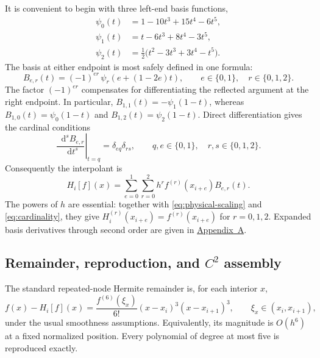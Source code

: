 \documentclass[11pt]{article}
\newcommand{\dd}{\mathop{}\!\mathrm{d}}
\begin{document}
It is convenient to begin with three left-end basis functions,
\begin{align}
  \psi_0(t)&=1-10t^3+15t^4-6t^5,\nonumber\\
  \psi_1(t)&=t-6t^3+8t^4-3t^5,\label{eq:psi-basis}\\
  \psi_2(t)&=\tfrac12\bigl(t^2-3t^3+3t^4-t^5\bigr).\nonumber
\end{align}
The basis at either endpoint is most safely defined in one formula:
\begin{equation}
  B_{e,r}(t)=(-1)^{er}\,
  \psi_r\!\left(e+(1-2e)t\right),
  \qquad e\in\{0,1\},\quad r\in\{0,1,2\}.
  \label{eq:oriented-basis}
\end{equation}
The factor $(-1)^{er}$ compensates for differentiating the reflected
argument at the right endpoint.  In particular,
\(B_{1,1}(t)=-\psi_1(1-t)\), whereas
\(B_{1,0}(t)=\psi_0(1-t)\) and
\(B_{1,2}(t)=\psi_2(1-t)\).  Direct differentiation gives the cardinal
conditions
\begin{equation}
  \left.\frac{\dd^s B_{e,r}}{\dd t^s}\right|_{t=q}
  =\delta_{eq}\delta_{rs},
  \qquad q,e\in\{0,1\},\quad r,s\in\{0,1,2\}.
  \label{eq:cardinality}
\end{equation}
Consequently the interpolant is
\begin{equation}
  H_i[f](x)=
  \sum_{e=0}^{1}\sum_{r=0}^{2}
  h^r f^{(r)}(x_{i+e})B_{e,r}(t).
  \label{eq:exact-hermite}
\end{equation}
The powers of $h$ are essential: together with
\eqref{eq:physical-scaling} and \eqref{eq:cardinality}, they give
\(H_i^{(r)}(x_{i+e})=f^{(r)}(x_{i+e})\) for $r=0,1,2$.  Expanded basis
derivatives through second order are given in
\hyperref[app:formulas]{Appendix~A}.

\subsection{Remainder, reproduction, and
  \texorpdfstring{$C^2$}{C2} assembly}

The standard repeated-node Hermite remainder is, for each interior $x$,
\begin{equation}
  f(x)-H_i[f](x)
  =\frac{f^{(6)}(\xi_x)}{6!}
    (x-x_i)^3(x-x_{i+1})^3,
  \qquad \xi_x\in(x_i,x_{i+1}),
  \label{eq:exact-remainder}
\end{equation}
under the usual smoothness assumptions.  Equivalently, its magnitude is
$O(h^6)$ at a fixed normalized position.  Every polynomial of degree at most
five is reproduced exactly.
\end{document}
